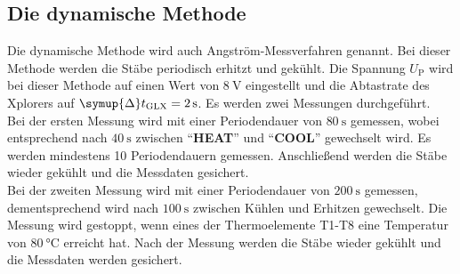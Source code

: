 \subsection{Die dynamische Methode}

    Die dynamische Methode wird auch Angström-Messverfahren genannt.
    Bei dieser Methode werden die Stäbe periodisch erhitzt und gekühlt.
    Die Spannung $U_\text{P}$ wird bei dieser Methode auf einen Wert von $\SI{8}{\volt}$ eingestellt
    und die Abtastrate des Xplorers auf $\symup{\Delta} t_\text{GLX} = \SI{2}{\second}$.
    Es werden zwei Messungen durchgeführt.\\
    Bei der ersten Messung wird mit einer Periodendauer von $\SI{80}{\second}$ gemessen, wobei
    entsprechend nach $\SI{40}{\second}$ zwischen \enquote{\textbf{HEAT}} und \enquote{\textbf{COOL}} gewechselt wird.
    Es werden mindestens 10 Periodendauern gemessen.
    Anschließend werden die Stäbe wieder gekühlt und die Messdaten gesichert.\\
    Bei der zweiten Messung wird mit einer Periodendauer von $\SI{200}{\second}$ gemessen,
    dementsprechend wird nach $\SI{100}{\second}$ zwischen Kühlen und Erhitzen gewechselt.
    Die Messung wird gestoppt, wenn eines der Thermoelemente T1-T8 eine Temperatur von $\SI{80}{\celsius}$
    erreicht hat.
    Nach der Messung werden die Stäbe wieder gekühlt und die Messdaten werden gesichert.
